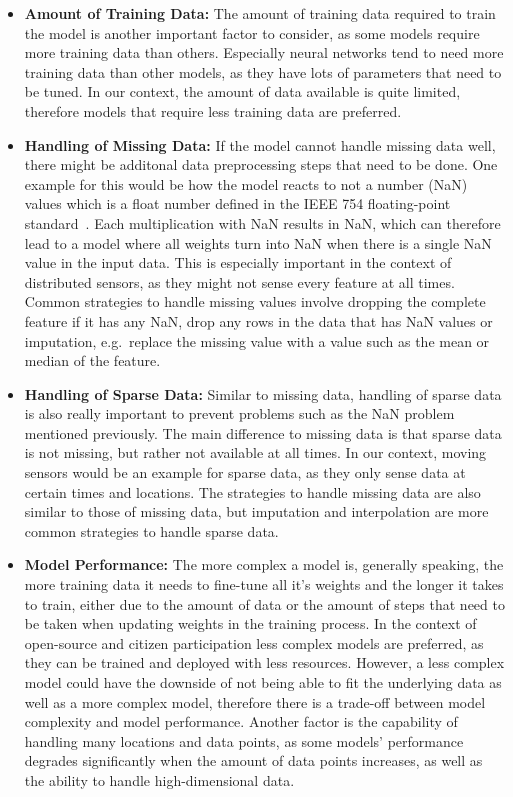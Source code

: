 \begin{itemize}
    \item \textbf{Amount of Training Data:} The amount of training data required to train the model is another important factor to consider, as some models require more training data than others. Especially neural networks tend to need more training data than other models, as they have lots of parameters that need to be tuned. In our context, the amount of data available is quite limited, therefore models that require less training data are preferred.
    \item \textbf{Handling of Missing Data:} If the model cannot handle missing data well, there might be additonal data preprocessing steps that need to be done. One example for this would be how the model reacts to not a number (NaN) values which is a float number defined in the IEEE 754 floating-point standard~\cite{ieee754}. Each multiplication with NaN results in NaN, which can therefore lead to a model where all weights turn into NaN when there is a single NaN value in the input data. This is especially important in the context of distributed sensors, as they might not sense every feature at all times. Common strategies to handle missing values involve dropping the complete feature if it has any NaN, drop any rows in the data that has NaN values or imputation, e.g.\ replace the missing value with a value such as the mean or median of the feature.
    \item \textbf{Handling of Sparse Data:} Similar to missing data, handling of sparse data is also really important to prevent problems such as the NaN problem mentioned previously. The main difference to missing data is that sparse data is not missing, but rather not available at all times. In our context, moving sensors would be an example for sparse data, as they only sense data at certain times and locations. The strategies to handle missing data are also similar to those of missing data, but imputation and interpolation are more common strategies to handle sparse data.
    \item \textbf{Model Performance:} The more complex a model is, generally speaking, the more training data it needs to fine-tune all it's weights and the longer it takes to train, either due to the amount of data or the amount of steps that need to be taken when updating weights in the training process. In the context of open-source and citizen participation less complex models are preferred, as they can be trained and deployed with less resources. However, a less complex model could have the downside of not being able to fit the underlying data as well as a more complex model, therefore there is a trade-off between model complexity and model performance. Another factor is the capability of handling many locations and data points, as some models' performance degrades significantly when the amount of data points increases, as well as the ability to handle high-dimensional data.

\end{itemize}
